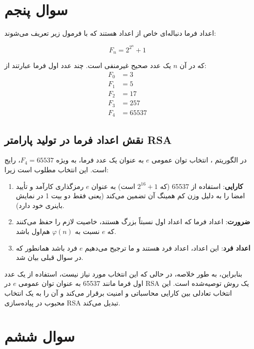 \documentclass{report}
\begin{document}
\section{سوال پنجم}

اعداد فرما دنباله‌ای خاص از اعداد هستند که با فرمول زیر تعریف می‌شوند:

\[ F_n = 2^{2^n} + 1 \]

که در آن \( n \) یک عدد صحیح غیرمنفی است. چند عدد اول فرما عبارتند از:
\begin{align*}
    F_0 &= 3 \\
    F_1 &= 5 \\
    F_2 &= 17 \\
    F_3 &= 257 \\
    F_4 &= 65537
\end{align*}

\subsection*{نقش اعداد فرما در تولید پارامتر RSA}
در الگوریتم ، انتخاب توان عمومی \( e \) به عنوان یک عدد فرما، به ویژه \( F_4 = 65537 \)، رایج است. این انتخاب مطلوب است زیرا:

\begin{enumerate}
    \item
    \textbf{کارایی}:
     استفاده از 65537 (که \( 2^{16} + 1 \) است) به عنوان \( e \) رمزگذاری کارآمد و تأیید امضا را به دلیل وزن کم همینگ آن تضمین می‌کند (یعنی فقط دو بیت 1 در نمایش باینری خود دارد).

    \item
    \textbf{ضرورت}:
     اعداد فرما که اعداد اول نسبتاً بزرگ هستند، خاصیت لازم را حفظ می‌کنند که \( e \) نسبت به \( \varphi(n) \) هم‌اول باشد.

    \item
    \textbf{اعداد فرد}:
     این اعداد، اعداد فرد هستند و ما ترجیح می‌دهیم \( e \) فرد باشد همانطور که در سوال قبلی بیان شد.

\end{enumerate}

بنابراین، به طور خلاصه، در حالی که این انتخاب مورد نیاز نیست، استفاده از یک عدد اول فرما مانند 65537 به عنوان توان عمومی \( e \) در RSA یک روش توصیه‌شده است. این انتخاب تعادلی بین کارایی محاسباتی و امنیت برقرار می‌کند و آن را به یک انتخاب محبوب در پیاده‌سازی RSA تبدیل می‌کند.

\section{سوال ششم}
\end{document}
